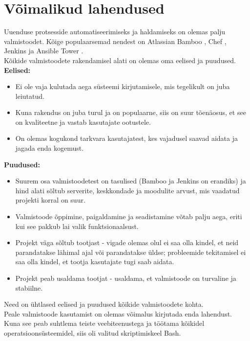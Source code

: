 \documentclass[12pt]{report}
\begin{document}
  \newpage
  
  \section{Võimalikud lahendused}
  
  Uuenduse protsesside automatiseerimiseks ja haldamiseks on olemas palju valmistoodet. Kõige populaarsemad nendest on Atlassian Bamboo \cite{bamboo}, Chef \cite{chef}, Jenkins \cite{jenkins} ja Ansible Tower \cite{ansible}.\\
  
  Kõikide valmistoodete rakendamisel alati on olemas oma eelised ja puudused.\\
  
  \textbf{Eelised:}
  \begin{itemize}
    \item Ei ole vaja kulutada aega süsteemi kirjutamisele, mis tegelikult on juba leiutatud.
    \item Kuna rakendus on juba turul ja on populaarne, siis on suur tõenäosus, et see on kvaliteetne ja vastab kasutajate ootustele.
    \item On olemas kogukond tarkvara kasutajatest, kes vajadusel saavad aidata ja jagada enda kogemust.
  \end{itemize}
  
  \textbf{Puudused:}
  \begin{itemize}
    \item Suurem osa valmistoodetest on tasulised (Bamboo ja Jenkins on erandiks) ja hind alati sõltub serverite, keskkondade ja moodulite arvust, mis vaadatud projekti korral on suur.
    \item Valmistoode õppimine, paigaldamine ja seadistamine võtab palju aega, eriti kui see pakkub lai valik funktsionaalsust.
    \item Projekt väga sõltub tootjast \-- vigade olemas olul ei saa olla kindel, et neid parandatakse lähimal ajal või parandatakse üldse; probleemide tekitamisel ei saa olla kindel, et tootja kasutajate tugi saab aidata.
    \item Projekt peab usaldama tootjat \-- usaldama, et valmistoode on turvaline ja stabiilne.
  \end{itemize}
  
  Need on ühtlased eelised ja puudused kõikide valmistoodete kohta.\\
  
  Peale valmistoode kasutamist on olemas võimalus kirjutada enda lahendust. Kuna see peab suhtlema teiste veebiteenustega ja töötama kõikidel operatsioonsüsteemidel, siis oli valitud skriptimiskeel Bash.\\
  
\end{document}
